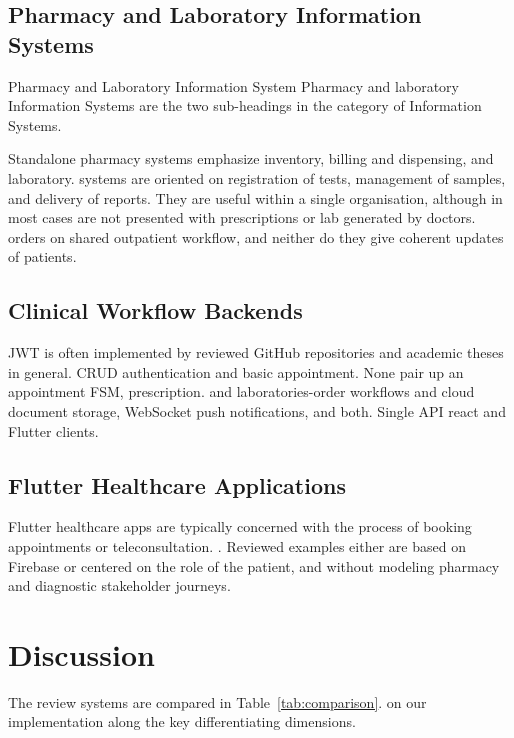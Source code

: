 \documentclass[12pt,a4paper]{report}
\begin{document}
\subsection{Pharmacy and Laboratory Information Systems}

Pharmacy and Laboratory Information System Pharmacy and laboratory Information Systems are the two sub-headings in the category of Information Systems.

Standalone pharmacy systems emphasize inventory, billing and dispensing, and laboratory.
systems are oriented on registration of tests, management of samples, and delivery of reports. They are useful
within a single organisation, although in most cases are not presented with prescriptions or lab generated by doctors.
orders on shared outpatient workflow, and neither do they give coherent updates of patients.

\subsection{Clinical Workflow Backends}

JWT is often implemented by reviewed GitHub repositories and academic theses \cite{r10} in general.
CRUD authentication and basic appointment. None pair up an appointment FSM, prescription.
and laboratories-order workflows and cloud document storage, WebSocket push notifications, and both.
Single API react and Flutter clients.

\subsection{Flutter Healthcare Applications}

Flutter healthcare apps are typically concerned with the process of booking appointments or teleconsultation.
\cite{r11}. Reviewed examples either are based on Firebase or centered on the role of the patient,
and without modeling pharmacy and diagnostic stakeholder journeys.

\section{Discussion}

The review systems are compared in Table~\ref{tab:comparison}.
on our implementation along the key differentiating dimensions.
\end{document}
